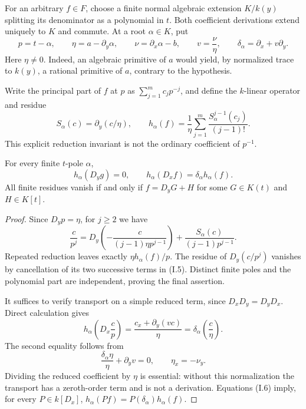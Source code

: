 For an arbitrary $f\in F$, choose a finite normal algebraic extension
$K/k(y)$ splitting its denominator as a polynomial in $t$.
Both coefficient derivations extend uniquely to $K$ and commute.
At a root $\alpha\in K$, put
\[
 p=t-\alpha,\qquad \eta=a-\partial_y\alpha,\qquad
 \nu=\partial_x\alpha-b,\qquad v=\frac\nu\eta,\qquad
 \delta_\alpha=\partial_x+v\partial_y.                  \tag{I.4}
\]
Here $\eta\ne0$.  Indeed, an algebraic primitive of $a$ would yield,
by normalized trace to $k(y)$, a rational primitive of $a$, contrary to
the hypothesis.

Write the principal part of $f$ at $p$ as
$\sum_{j=1}^m c_jp^{-j}$, and define the $k$-linear operator and residue
\[
 S_\alpha(c)=\partial_y(c/\eta),\qquad
 h_\alpha(f)=\frac1\eta
       \sum_{j=1}^m\frac{S_\alpha^{j-1}(c_j)}{(j-1)!}.
                                                               \tag{I.5}
\]
This explicit reduction invariant is not the ordinary coefficient of
$p^{-1}$.

\begin{lemma}
\label{int:residue}
For every finite $t$-pole $\alpha$,
\[
 h_\alpha(D_yg)=0,\qquad
 h_\alpha(D_xf)=\delta_\alpha h_\alpha(f).              \tag{I.6}
\]
All finite residues vanish if and only if
$f=D_yG+H$ for some $G\in K(t)$ and $H\in K[t]$.
\end{lemma}
\begin{proof}
Since $D_yp=\eta$, for $j\geq2$ we have
\[
 \frac{c}{p^j}
 =D_y\!\left(-\frac{c}{(j-1)\eta p^{j-1}}\right)
       +\frac{S_\alpha(c)}{(j-1)p^{j-1}}.              \tag{I.7}
\]
Repeated reduction leaves exactly $\eta h_\alpha(f)/p$.
The residue of $D_y(c/p^j)$ vanishes by cancellation of its two
successive terms in (I.5).  Distinct finite poles and the polynomial
part are independent, proving the final assertion.

It suffices to verify transport on a simple reduced term, since
$D_xD_y=D_yD_x$.  Direct calculation gives
\[
 h_\alpha\!\left(D_x\frac{c}{p}\right)
   =\frac{c_x+\partial_y(vc)}{\eta}
   =\delta_\alpha\!\left(\frac c\eta\right).          \tag{I.8}
\]
The second equality follows from
\[
 \frac{\delta_\alpha\eta}{\eta}+\partial_yv=0,
 \qquad \eta_x=-\nu_y.                                \tag{I.9}
\]
Dividing the reduced coefficient by $\eta$ is essential: without this
normalization the transport has a zeroth-order term and is not a
derivation.  Equations (I.6) imply, for every $P\in k[D_x]$,
$h_\alpha(Pf)=P(\delta_\alpha)h_\alpha(f)$.
\end{proof}

